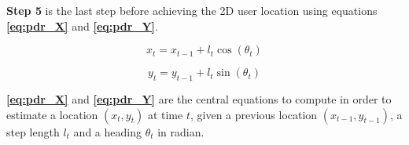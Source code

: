 \textbf{Step 5} is the last step before achieving the 2D user location using equations \textbf{\autoref{eq:pdr_X}} and \textbf{\autoref{eq:pdr_Y}}.

\begin{equation} \label{eq:pdr_X}
    x_t = x_{t - 1} + l_t\cos(\theta_t)
\end{equation}

\begin{equation} \label{eq:pdr_Y}
    y_t = y_{t - 1} + l_t\sin(\theta_t)
\end{equation}

\textbf{\autoref{eq:pdr_X}} and \textbf{\autoref{eq:pdr_Y}} are the central equations to compute in order to estimate a location $(x_t, y_t)$ at time $t$, given a previous location $(x_{t - 1}, y_{t - 1})$, a step length $l_t$ and a heading $\theta_t$ in radian.
